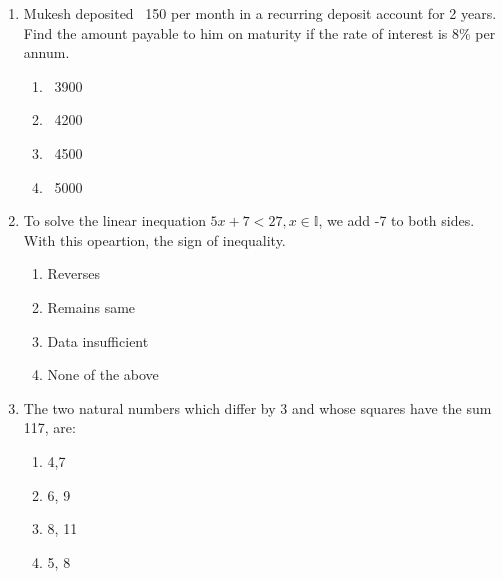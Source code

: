 \begin{enumerate}[label=(\roman*)]

    \item Mukesh deposited \rupee~150 per month in a recurring deposit
        account for 2 years. Find the amount payable to him on maturity if the 
        rate of interest is 8\% per annum.

        \begin{multicols}{2}
        \begin{enumerate}[label=(\alph*)]
            \item \rupee~3900 
            \item \rupee~4200
            \item \rupee~4500
            \item \rupee~5000
        \end{enumerate}
        \end{multicols}

    \newpage
    \item To solve the linear inequation $5x + 7 < 27, x \in \mathbb{I}$, we add
        -7 to both sides. With this opeartion, the sign of inequality.

        \begin{multicols}{2}
        \begin{enumerate}[label=(\alph*)]
            \item Reverses 
            \item Remains same
            \item Data insufficient
            \item None of the above
        \end{enumerate}
        \end{multicols}

    \item The two natural numbers which differ by 3 and whose squares
        have the sum 117, are:

        \begin{multicols}{2}
        \begin{enumerate}[label=(\alph*)]
            \item 4,7 
            \item 6, 9
            \item 8, 11
            \item 5, 8
        \end{enumerate}
        \end{multicols}


\end{enumerate}
